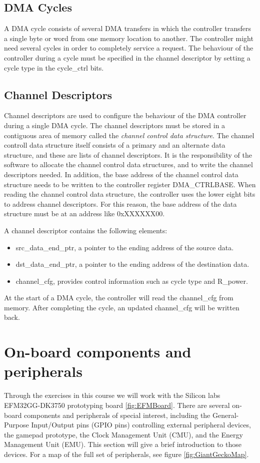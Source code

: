 \subsection{DMA Cycles}
A DMA cycle consists of several DMA transfers in which the controller transfers a single byte or word from one memory location to another. The controller might need several cycles in order to completely service a request. The behaviour of the controller during a cycle must be specified in the channel descriptor by setting a cycle type in the cycle\_ctrl bits.

\subsection{Channel Descriptors}
Channel descriptors are used to configure the behaviour of the DMA controller during a single DMA cycle. The channel descriptors must be stored in a contiguous area of memory called the \emph{channel control data structure}. The channel controll data structure itself consists of a primary and an alternate data structure, and these are lists of channel descriptors. It is the responsibility of the software to allocate the channel control data structures, and to write the channel descriptors needed. In addition, the base address of the channel control data structure needs to be written to the controller register DMA\_CTRLBASE. When reading the channel control data structure, the controller uses the lower eight bits to address channel descriptors. For this reason, the base address of the data structure must be at an address like 0xXXXXXX00.

A channel descriptor contains the following elements:
\begin{itemize}
	\item src\_data\_end\_ptr, a pointer to the ending address of the source data.
	\item dst\_data\_end\_ptr, a pointer to the ending address of the destination data.
	\item channel\_cfg, provides control information such as cycle type and R\_power.
\end{itemize}
At the start of a DMA cycle, the controller will read the channel\_cfg from memory. After completing the cycle, an updated channel\_cfg will be written back.


\section{On-board components and peripherals}
Through the exercises in this course we will work with the Silicon labs EFM32GG-DK3750 prototyping board \ref{fig:EFMBoard}. There are several on-board components and peripherals of special interest, including the General-Purpose Input/Output pins (GPIO pins) controlling external peripheral devices, the gamepad prototype, the Clock Management Unit (CMU), and the Energy Management Unit (EMU). This section will give a brief introduction to those devices. For a map of the full set of peripherals, see figure \ref{fig:GiantGeckoMap}.


